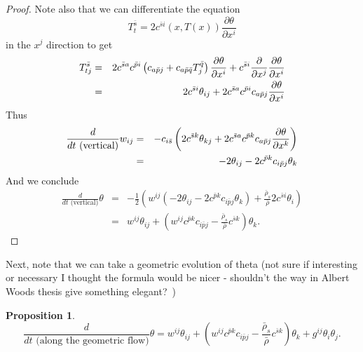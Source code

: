 \documentclass[12pt,letterpaper]{amsart}%
\newcounter{mycounter}
\numberwithin{mycounter}{section}
\theoremstyle{plain}
\newtheorem{proposition}[mycounter]{Proposition}
\numberwithin{equation}{section}
\theoremstyle{definition}
\begin{document}
\begin{proof}
Note also that we can differentiate the equation 
\begin{equation*}
T_{t}^{\bar{s}}=2c^{\bar{s}i}(x,T(x))\frac{\partial \theta }{\partial x^{i}}
\end{equation*}%
in the $x^{j}$ direction to get 
\begin{eqnarray*}
T_{tj}^{\bar{s}} &=&2c^{\bar{s}a}c^{\bar{p}i}\left( c_{a\bar{p}j}+c_{a\bar{p}%
\bar{q}}T_{j}^{\bar{q}}\right) \frac{\partial \theta }{\partial x^{i}}+c^{%
\bar{s}i}\frac{\partial }{\partial x^{j}}\frac{\partial \theta }{\partial
x^{i}} \\
&=&2c^{\bar{s}i}\theta _{ij}+2c^{\bar{s}a}c^{\bar{p}i}c_{a\bar{p}j}\frac{%
\partial \theta }{\partial x^{i}}
\end{eqnarray*}%
Thus 
\begin{eqnarray*}
\frac{d}{dt\text{ (vertical)}}w_{ij} &=&-c_{i\bar{s}}\left( 2c^{\bar{s}%
k}\theta _{kj}+2c^{\bar{s}a}c^{\bar{p}k}c_{a\bar{p}j}\frac{\partial \theta }{%
\partial x^{k}}\right)  \\
&=&-2\theta _{ij}-2c^{\bar{p}k}c_{i\bar{p}j}\theta _{k}
\end{eqnarray*}%
And we conclude  
\begin{eqnarray*}
\frac{d}{dt\text{ (vertical)}}\theta  &=&-\frac{1}{2}\left( w^{ij}\left(
-2\theta _{ij}-2c^{\bar{p}k}c_{i\bar{p}j}\theta _{k}\right) +\frac{\bar{\rho}%
_{s}}{\bar{\rho}}2c^{\bar{s}i}\theta _{i}\right)  \\
&=&w^{ij}\theta _{ij}+\left( w^{ij}c^{\bar{p}k}c_{i\bar{p}j}-\frac{\bar{\rho}%
_{s}}{\bar{\rho}}c^{\bar{s}k}\right) \theta _{k}.
\end{eqnarray*}
\end{proof}

Next, note that we can take a geometric evolution of theta (not sure if
interesting or necessary I thought the formula would be nicer - shouldn't
the way in Albert Woods thesis give something elegant?\ )\ 

\begin{proposition}
\begin{equation*}
\frac{d}{dt\text{\ (along the geometric flow)}}\theta =w^{ij}\theta
_{ij}+\left( w^{ij}c^{\bar{p}k}c_{i\bar{p}j}-\frac{\bar{\rho}_{s}}{\bar{\rho}%
}c^{\bar{s}k}\right) \theta _{k}+g^{ij}\theta _{i}\theta _{j}.
\end{equation*}
\end{proposition}
\end{document}
